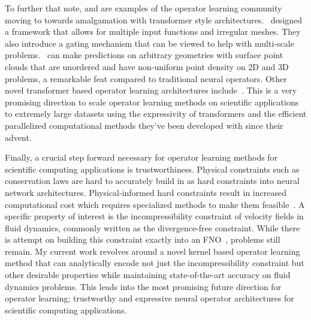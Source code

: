 To further that note, \citep{hao2023gnot} and \cite{liu2025geometry} are examples of the operator learning community moving to towards amalgamation with transformer style architectures.~\citep{hao2023gnot} designed a framework that allows for multiple input functions and irregular meshes. They also introduce a gating mechanism that can be viewed to help with multi-scale problems.~\citep{liu2025geometry} can make predictions on arbitrary geometries with surface point clouds that are unordered and have non-uniform point density on 2D and 3D problems, a remarkable feat compared to traditional neural operators. Other novel transformer based operator learning architectures include~\citep{cao2021choose, liu2024mitigating, li2022transformer}. This is a very promising direction to scale operator learning methods on scientific applications to extremely large datasets using the expressivity of transformers and the efficient parallelized computational methods they've been developed with since their advent.

Finally, a crucial step forward necessary for operator learning methods for scientific computing applications is trustworthiness. Physical constraints such as conservation laws are hard to accurately build in as hard constraints into neural network architectures. Physical-informed hard constraints result in increased computational cost which requires specialized methods to make them feasible~\citep{chalapathi2024scaling}. A specific property of interest is the incompressibility constraint of velocity fields in fluid dynamics, commonly written as the divergence-free constraint. While there is attempt on building this constraint exactly into an FNO~\citep{khorrami2024physics}, problems still remain. My current work revolves around a novel kernel based operator learning method that can analytically encode not just the incompressibility constraint but other desirable properties while maintaining state-of-the-art accuracy on fluid dynamics problems. This leads into the most promising future direction for operator learning; trustworthy and expressive neural operator architectures for scientific computing applications.
%
\pagebreak
